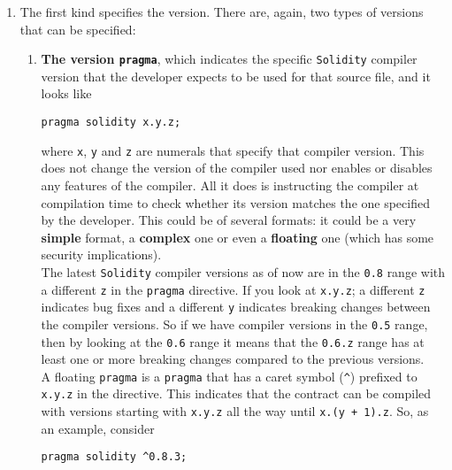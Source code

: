 \begin{enumerate}
   
   \item The first kind specifies the version.
   There are, again, two types of versions that can be specified:
   \begin{enumerate}[label*=\arabic*.]
      
      \item\textbf{The version \texttt{pragma}}, which indicates the specific \texttt{Solidity} compiler version that the developer expects to be used for that source file, and it looks like

      \begin{lstlisting}[language=Solidity, style=solStyle, caption={Example of version \texttt{pragma} statement.}]
pragma solidity x.y.z;
      \end{lstlisting}

      where \texttt{x}, \texttt{y} and \texttt{z} are numerals that specify that compiler version.
      This does not change the version of the compiler used nor enables or disables any features of the compiler.
      All it does is instructing the compiler at compilation time to check whether its version matches the one specified by the developer.
      This could be of several formats: it could be a very \textbf{simple} format, a \textbf{complex} one or even a \textbf{floating} one (which has some security implications).\\

      The latest \texttt{Solidity} compiler versions as of now are in the \texttt{0.8} range with a different \texttt{z} in the \texttt{pragma} directive.
      If you look at \texttt{x.y.z}; a different \texttt{z} indicates bug fixes and a different \texttt{y} indicates breaking changes between the compiler versions.
      So if we have compiler versions in the \texttt{0.5} range, then by looking at the \texttt{0.6} range it means that the \texttt{0.6.z} range has at least one or more breaking changes compared to the previous versions.\\

      A floating \texttt{pragma} is a \texttt{pragma} that has a caret symbol (\verb|^|) prefixed to \texttt{x.y.z} in the directive.
      This indicates that the contract can be compiled with versions starting with \texttt{x.y.z} all the way until \texttt{x.(y + 1).z}. So, as an example, consider

      \begin{lstlisting}[language=Solidity, style=solStyle, caption={Example of floating \texttt{pragma} statement.}]
pragma solidity ^0.8.3;
      \end{lstlisting}


\end{enumerate}
\end{enumerate}
